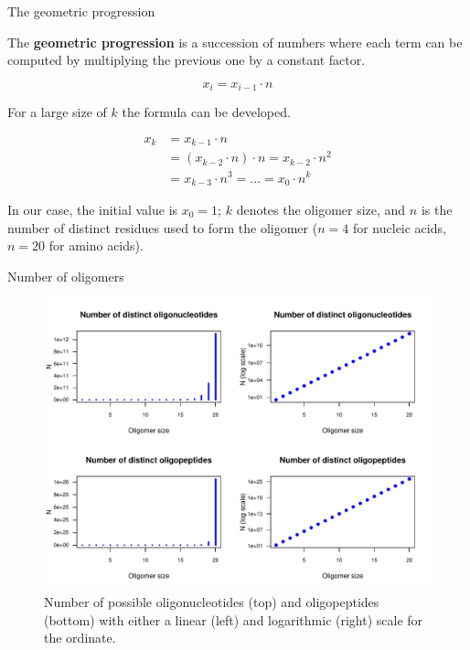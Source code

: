 \documentclass[ignorenonframetext,]{beamer}
\begin{document}
\begin{frame}{The geometric progression}
\protect\hypertarget{the-geometric-progression}{}

The \textbf{geometric progression} is a succession of numbers where each
term can be computed by multiplying the previous one by a constant
factor.

\[x_i = x_{i-1} \cdot n\]

For a large size of \(k\) the formula can be developed.

\[\begin{aligned}
x_k &=  x_{k-1} \cdot n \\
&=  (x_{k-2} \cdot n) \cdot n = x_{k-2} \cdot n^2 \\
&=  x_{k-3} \cdot n^3 = \ldots = x_0 \cdot n^k 
\end{aligned}\]

In our case, the initial value is \(x_0=1\); \(k\) denotes the oligomer
size, and \(n\) is the number of distinct residues used to form the
oligomer (\(n=4\) for nucleic acids, \(n=20\) for amino acids).

\end{frame}

\begin{frame}{Number of oligomers}
\protect\hypertarget{number-of-oligomers}{}

\begin{figure}

{\centering \includegraphics[width=0.6\linewidth]{figures/02_combinatorics_number_distinct_oligos-1} 

}

\caption{Number of possible oligonucleotides (top) and oligopeptides (bottom) with either a linear (left) and logarithmic (right) scale for the ordinate.}\label{fig:number_distinct_oligos}
\end{figure}

\end{frame}
\end{document}
